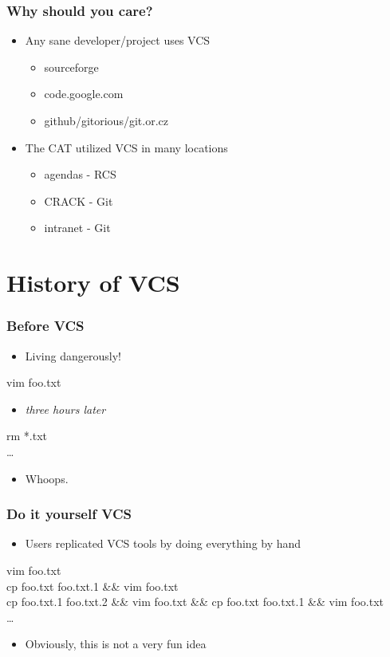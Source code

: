 \documentclass{beamer}
\begin{document}
\begin{frame}
    \frametitle{Why should you care?}
    \begin{itemize}
	\item Any sane developer/project uses VCS
	\begin{itemize}
	    \item sourceforge
	    \item code.google.com
	    \item github/gitorious/git.or.cz
	\end{itemize}
	\item The CAT utilized VCS in many locations
	\begin{itemize}
	    \item agendas - RCS
	    \item CRACK - Git
	    \item intranet - Git
	\end{itemize}
    \end{itemize}
\end{frame}

\section{History of VCS}

\begin{frame}
    \frametitle{Before VCS}
    \begin{itemize}
	\item Living dangerously!
    \end{itemize}
    vim foo.txt \\
    \begin{itemize}
	\item {\em three hours later} \\
    \end{itemize}
    rm *.txt \\
    \ldots \\
    \begin{itemize}
	\item Whoops. \\
    \end{itemize}
\end{frame}

\begin{frame}
    \frametitle{Do it yourself VCS}
    \begin{itemize}
	\item Users replicated VCS tools by doing everything by hand
    \end{itemize}
     vim foo.txt \\
     cp foo.txt foo.txt.1 \&\& vim foo.txt \\
     cp foo.txt.1 foo.txt.2 \&\& vim foo.txt \&\& cp foo.txt foo.txt.1 \&\& vim foo.txt \\
    \ldots
    \begin{itemize}
	\item Obviously, this is not a very fun idea
    \end{itemize}
\end{frame}
\end{document}
